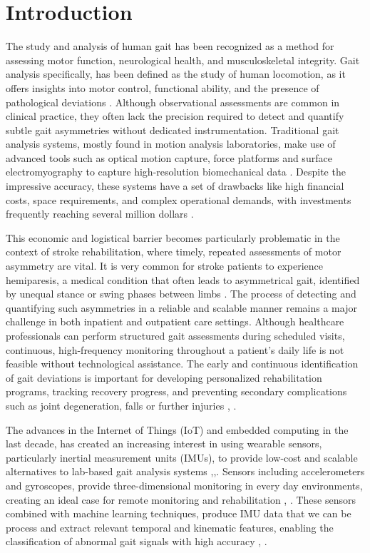 \section{Introduction}
\label{sec:introduction}
The study and analysis of human gait has been recognized as a method for assessing motor function, neurological health, and musculoskeletal integrity. 
Gait analysis specifically, has been defined as the study of human locomotion, as it offers insights into motor control, functional ability, and the presence of 
pathological deviations \cite{ref1, ref2}. Although observational assessments are common in clinical practice, they often lack the precision required 
to detect and quantify subtle gait asymmetries without dedicated instrumentation. Traditional gait analysis systems, mostly found in motion analysis 
laboratories, make use of advanced tools such as optical motion capture, force platforms and surface electromyography to capture high-resolution biomechanical 
data \cite{ref3}. Despite the impressive accuracy, these systems have a set of drawbacks like high financial costs, space requirements, and complex operational 
demands, with investments frequently reaching several million dollars \cite{ref4}.

This economic and logistical barrier becomes particularly problematic in the context of stroke rehabilitation, where timely, repeated 
assessments of motor asymmetry are vital. It is very common for stroke patients to experience hemiparesis, a medical condition that often leads to 
asymmetrical gait, identified by unequal stance or swing phases between limbs \cite{ref5}. The process of detecting and quantifying such asymmetries in a 
reliable and scalable manner remains a major challenge in both inpatient and outpatient care settings. Although healthcare professionals can perform structured 
gait assessments during scheduled visits, continuous, high-frequency monitoring throughout a patient's daily life is not feasible without technological assistance. 
The early and continuous identification of gait deviations is important for developing personalized rehabilitation programs, tracking recovery progress, 
and preventing secondary complications such as joint degeneration, falls or further injuries \cite{ref6}, \cite{ref7}.

The advances in the Internet of Things (IoT) and embedded computing in the last decade, has created an increasing interest in using wearable sensors, 
particularly inertial measurement units (IMUs), to provide low-cost and scalable alternatives to lab-based gait analysis systems \cite{ref8},\cite{ref9},\cite{ref10}. 
Sensors including accelerometers and gyroscopes, provide three-dimensional monitoring in every day environments, creating an ideal case for remote monitoring and 
rehabilitation \cite{ref11}, \cite{ref12}. These sensors combined with machine learning techniques, produce IMU data that we can be process and extract relevant 
temporal and kinematic features, enabling the classification of abnormal gait signals with high accuracy \cite{ref13}, \cite{ref14}.

